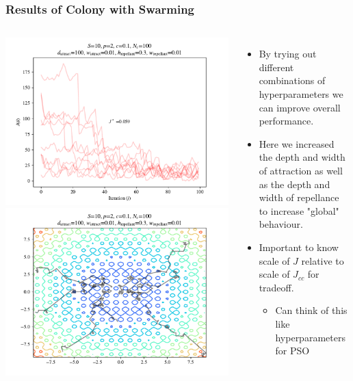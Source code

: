 \documentclass{beamer}
\begin{document}
\begin{frame}
\frametitle{Results of Colony with Swarming}
\begin{columns}
    \begin{center}
      \includegraphics[scale=0.3]{assets/rastrigin_colony_tuned_J}
      \includegraphics[scale=0.3]{assets/rastrigin_colony_tuned_theta}
    \end{center}
    \begin{itemize}
      \item<1-> By trying out different combinations of hyperparameters we can improve overall performance.
      \item<1-> Here we increased the depth and width of attraction as well as the depth and width of repellance to increase "global" behaviour.
      \item<2-> Important to know scale of $J$ relative to scale of $J_{cc}$ for tradeoff.
      \begin{itemize}
        \item<2-> Can think of this like hyperparameters for PSO
      \end{itemize}
    \end{itemize}
\end{columns}
\end{frame}
\end{document}
